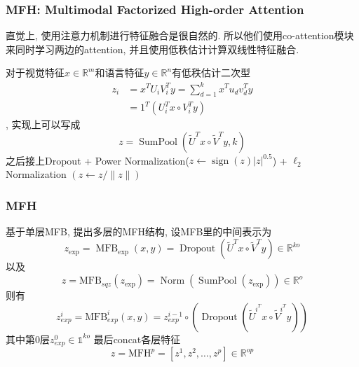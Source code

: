 \documentclass{beamer}
\begin{document}
\begin{frame}
    \frametitle{MFH: Multimodal Factorized High-order Attention}

    直觉上, 使用注意力机制进行特征融合是很自然的. 所以他们使用co-attention模块来同时学习两边的attention, 并且使用低秩估计计算双线性特征融合.

    对于视觉特征$x \in \mathbb{R}^{m}$和语言特征$y \in \mathbb{R}^{n}$有低秩估计二次型
    \begin{equation}
        \begin{aligned}
        z_{i} &=x^{T} U_{i} V_{i}^{T} y=\sum_{d=1}^{k} x^{T} u_{d} v_{d}^{T} y \\
        &=1^{T}\left(U_{i}^{T} x \circ V_{i}^{T} y\right)
        \end{aligned}
    \end{equation},
    实现上可以写成
    \begin{equation}
        z=\operatorname{SumPool}\left(\tilde{U}^{T} x \circ \tilde{V}^{T} y, k\right)
    \end{equation}
    之后接上Dropout + Power Normalization($z \leftarrow \operatorname{sign}(z)|z|^{0.5}$) + $\ell_2$ Normalization $(z \leftarrow z /\|z\|)$

\end{frame}

\begin{frame}
    \frametitle{MFH}

    基于单层MFB, 提出多层的MFH结构, 设MFB里的中间表示为
    \begin{equation}
        z_{\exp }=\operatorname{MFB}_{\exp }(x, y)=\operatorname{Dropout}\left(\tilde{U}^{T} x \circ \tilde{V}^{T} y\right) \in \mathbb{R}^{k o}
    \end{equation}
    以及
    \begin{equation}
        z=\mathrm{MFB}_{s q z}\left(z_{\exp }\right)=\operatorname{Norm}\left(\operatorname{SumPool}\left(z_{\exp }\right)\right) \in \mathbb{R}^{o}
    \end{equation}
    则有
    \begin{equation}
        z_{e x p}^{i}=\mathrm{MFB}_{e x p}^{i}(x, y)=z_{e x p}^{i-1} \circ\left(\operatorname{Dropout}\left(\tilde{U}^{i^{T}} x \circ \tilde{V}^{i^{T}} y\right)\right)
    \end{equation}
    其中第0层$z_{e x p}^{0} \in \mathbb{1}^{k o}$   
    最后concat各层特征  
    \begin{equation}
        z=\mathrm{MFH}^{p}=\left[z^{1}, z^{2}, \ldots, z^{p}\right] \in \mathbb{R}^{o p}
    \end{equation}

\end{frame}
\end{document}

